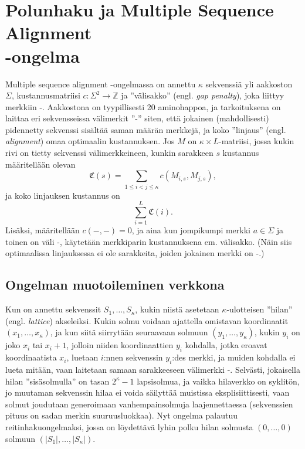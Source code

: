 \documentclass[finnish]{tktltiki2}
\theoremstyle{definition}
\theoremstyle{remark}
\begin{document}
\section{Polunhaku ja Multiple Sequence Alignment \\-ongelma}
Multiple sequence alignment -ongelmassa on annettu $\kappa$ sekvenssiä yli aakkoston $\Sigma$, kustannusmatriisi $c \colon \Sigma^2 \to \mathbb{Z}$ ja ''välisakko'' (engl. \textit{gap penalty}), joka liittyy merkkiin -. Aakkostona on tyypillisesti 20 aminohappoa, ja tarkoituksena on laittaa eri sekvensseissa välimerkit ''-'' siten, että jokainen (mahdollisesti) pidennetty sekvenssi sisältää saman määrän merkkejä, ja koko ''linjaus'' (engl. \textit{alignment}) omaa optimaalin kustannuksen. Jos $M$ on $\kappa \times L$-matriisi, jossa kukin rivi on tietty sekvenssi välimerkkeineen, kunkin sarakkeen $s$ kustannus määritellään olevan 
\[
\mathfrak{C}(s) = \sum_{1 \leq i < j \leq \kappa} c(M_{i, s}, M_{j, s}),
\]
ja koko linjauksen kustannus on
\[
\sum_{i = 1}^L \mathfrak{C}(i).
\]
Lisäksi, määritellään $c(-,-) = 0$, ja aina kun jompikumpi merkki $a \in \Sigma$ ja toinen on väli -, käytetään merkkiparin kustannuksena em. välisakko. (Näin siis optimaalissa linjauksessa ei ole sarakkeita, joiden jokainen merkki on -.)

\subsection{Ongelman muotoileminen verkkona}
Kun on annettu sekvenssit $S_1, \dots, S_{\kappa}$, kukin niistä asetetaan $\kappa$-ulotteisen ''hilan'' (engl. \textit{lattice}) akseleiksi. Kukin solmu voidaan ajattella omistavan koordinaatit $(x_1, \dots, x_{\kappa})$, ja kun siitä siirrytään seuraavaan solmuun $(y_1, \dots, y_{\kappa})$, kukin $y_i$ on joko $x_i$ tai $x_i + 1$, jolloin niiden koordinaattien $y_i$ kohdalla, jotka eroavat koordinaatista $x_i$, luetaan $i$:nnen sekvenssin $y_i$:des merkki, ja muiden kohdalla ei lueta mitään, vaan laitetaan samaan sarakkeeseen välimerkki -. Selvästi, jokaisella hilan ''sisäsolmulla'' on tasan $2^{\kappa} - 1$ lapsisolmua, ja vaikka hilaverkko on syklitön, jo muutaman sekvenssin hilaa ei voida säilyttää muistissa eksplisiittisesti, vaan solmut joudutaan generoimaan vanhempainsolmuja laajennettaessa (sekvenssien pituus on sadan merkin suuruusluokkaa). Nyt ongelma palautuu reitinhakuongelmaksi, jossa on löydettävä lyhin polku hilan solmusta $(0, \dots, 0)$ solmuun $(|S_1|, \dots, |S_{\kappa}|)$.
\end{document}
